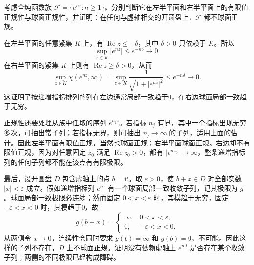 \begin{exercise}\label{b3:ex:04-5}
考虑全纯函数族 \(\mathcal F=\{e^{nz}:n\ge1\}\)。分别判断它在左半平面和右半平面上的有限值正规性与球面正规性，并证明：在任何与虚轴相交的开圆盘上，\(\mathcal F\) 都不球面正规。
\end{exercise}
\begin{solution}
在左半平面的任意紧集 \(K\) 上，有 \(\operatorname{Re}z\le-\delta\)，其中 \(\delta>0\) 只依赖于 \(K\)。所以
\[
 \sup_{z\in K}|e^{nz}|\le e^{-n\delta}\longrightarrow0.
\]
在右半平面的紧集 \(K\) 上则有 \(\operatorname{Re}z\ge\delta>0\)，从而
\[
 \sup_{z\in K}\chi(e^{nz},\infty)
 =\sup_{z\in K}\frac1{\sqrt{1+|e^{nz}|^2}}
 \le e^{-n\delta}\longrightarrow0.
\]
这证明了按递增指标排列的列在左边通常局部一致趋于0，在右边球面局部一致趋于无穷。

正规性还要处理从族中任取的序列 \(e^{n_jz}\)。若指标 \(n_j\) 有界，其中一个指标出现无穷多次，可抽出常子列；若指标无界，则可抽出 \(n_j\to\infty\) 的子列，适用上面的估计。因此左半平面有限值正规，当然也球面正规；右半平面球面正规。右边却不有限值正规，因为对任意固定 \(z_0\) 满足 \(\operatorname{Re}z_0>0\)，都有 \(|e^{nz_0}|\to\infty\)，整条递增指标列的任何子列都不能在该点有有限极限。

最后，设开圆盘 \(D\) 包含虚轴上的点 \(b=\mathrm{i}t\)。取 \(\varepsilon>0\)，使 \(b+x\in D\) 对全部实数 \(|x|<\varepsilon\) 成立。假如递增指标列 \(e^{nz}\) 有一个球面局部一致收敛子列，记其极限为 \(g\)。球面局部一致极限必连续；然而固定 \(0<x<\varepsilon\) 时，其模趋于无穷，固定 \(-\varepsilon<x<0\) 时，其模趋于0，故
\[
 g(b+x)=
 \begin{cases}
  \infty,&0<x<\varepsilon,\\
  0,&-\varepsilon<x<0.
 \end{cases}
\]
从两侧令 \(x\to0\)，连续性会同时要求 \(g(b)=\infty\) 和 \(g(b)=0\)，不可能。因此这样的子列不存在，\(D\) 上不球面正规。证明没有依赖虚轴上 \(e^{n\mathrm{i}t}\) 是否存在某个收敛子列；两侧的不同极限已经构成障碍。
\end{solution}

